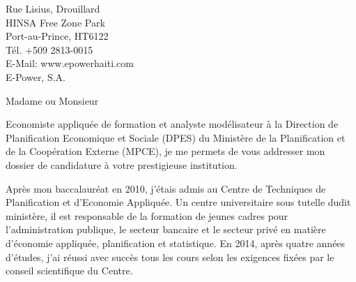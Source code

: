\documentclass[12pt]{lettre}
\date{le  11 ao\^{u}t 2020}%
\begin{document}
\begin{letter}{
Rue Lisius, Drouillard\\
HINSA  Free Zone Park \\
Port-au-Prince, HT6122  \\
T\'{e}l. +509 2813-0015 \\
E-Mail: www.epowerhaiti.com\\
E-Power, S.A.
}

\address{
 Alexandro Disla\\
25, carefour Ism\'{e}, impasse F\'{e}n\'{e}lon\\
Pernier 23} 
\nofax{}
\signature{}
 
 
 
\opening{Madame ou Monsieur}

\begin{spacing}{1.5}

Economiste appliqu\'{e}e de formation et analyste mod\'{e}lisateur
\`{a} la Direction de Planification Economique et Sociale (DPES) 
du Minist\`{e}re de la Planification et de la Coop\'{e}ration 
Externe (MPCE), je me permets de vous addresser mon dossier de candidature \`{a} votre prestigieuse institution. 

Apr\`{e}s mon baccalaur\'{e}at en 2010, j'\'{e}tais admis au  Centre de Techniques
de Planification et d'Economie Appliqu\'{e}e. Un centre universitaire sous tutelle 
dudit minist\`{e}re, il est responsable de la formation de jeunes cadres pour 
l'administration publique, le secteur bancaire et le secteur  priv\'{e} 
en mati\`{e}re d'\'{e}conomie appliqu\'{e}e, planification et statistique. 
En 2014, apr\`{e}s quatre ann\'{e}es d'\'{e}tudes, j'ai r\'{e}ussi 
avec succ\`{e}s tous les cours selon les exigences fix\'{e}es
 par le conseil scientifique du Centre.


\end{spacing}
\end{letter}
\end{document}
